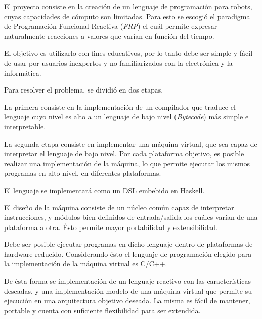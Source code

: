 

El proyecto consiste en la creación de un lenguaje de programación
para robots, cuyas capacidades de cómputo son limitadas.
Para esto se escogió el paradigma de Programación Funcional Reactiva
(\emph{FRP}) el cuál permite expresar naturalmente reacciones a
valores que varían en función del tiempo.

El objetivo es utilizarlo con fines educativos,
por lo tanto debe ser simple y fácil de usar por usuarios
inexpertos y no familiarizados con la electrónica y la informática.

Para resolver el problema, se dividió en dos etapas.

La primera consiste en la implementación de
un compilador que traduce el lenguaje cuyo nivel es alto a
un lenguaje de bajo nivel (\emph{Bytecode}) más simple e interpretable.

La segunda etapa consiste en implementar una máquina virtual, que
sea capaz de interpretar el lenguaje de bajo nivel.
Por cada plataforma objetivo, es posible realizar una implementación de
la máquina, lo que permite ejecutar los mismos
programas en alto nivel, en diferentes plataformas.

El lenguaje se implementará como un DSL embebido en Haskell.

El diseño de la máquina consiste de un núcleo común capaz de interpretar
instrucciones, y módulos bien definidos de
entrada/salida los cuáles varían de una plataforma a otra.
Ésto permite mayor portabilidad y extensibilidad.

Debe ser posible ejecutar programas en dicho lenguaje dentro de plataformas
de hardware reducido.
Considerando ésto el lenguaje de programación elegido para la
implementación de la máquina virtual es C/C++.

De ésta forma se implementación de un lenguaje reactivo con las
características deseadas, y una implementación modelo de una máquina
virtual que permite
su ejecución en una arquitectura objetivo deseada.
La misma es fácil de mantener, portable y cuenta con suficiente
flexibilidad para ser extendida.
